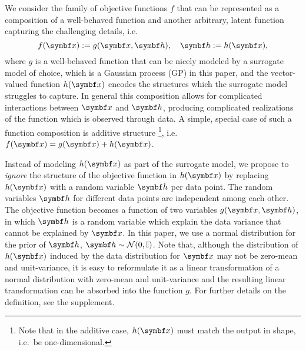 We consider the family of objective functions $f$ that can be represented as a composition of a well-behaved function and another arbitrary, latent function capturing the challenging details, i.e.
\begin{equation}
    \label{eq:bayesian_optimization:well_behaved}
    f(\mat{x}) := g(\mat{x}, \mat{h}), \quad \mat{h}:=h(\mat{x}),
\end{equation}
where $g$ is a well-behaved function that can be nicely modeled by a surrogate model of choice,
which is a Gaussian process (GP) in this paper,
and the vector-valued function $h(\mat{x})$ encodes the structures which the surrogate model struggles to capture.
In general this composition allows for complicated interactions between $\mat{x}$ and $\mat{h}$, producing complicated realizations of the function
which is observed through data.
A simple, special case of such a function composition is additive structure
\footnote{Note that in the additive case, $h(\mat{x})$ must match the output in shape, i.e.~be one-dimensional.},
i.e.\ $f(\mat{x}) = g(\mat{x}) + h(\mat{x})$.

Instead of modeling $h(\mat{x})$ as part of the surrogate model,
we propose to \textit{ignore} the structure of the objective function in $h(\mat{x})$ by replacing $h(\mat{x})$ with a random variable $\mat{h}$ per data point.
The random variables $\mat{h}$ for different data points  are independent among each other.
The objective function becomes a function of two variables $g(\mat{x}, \mat{h})$,
in which $\mat{h}$ is a random variable which explain the data variance that cannot be explained by $\mat{x}$.
In this paper, we use a normal distribution for the prior of $\mat{h}$, $\mat{h} \sim \mathcal{N}(0,  \mathbb{I})$.
Note that, although the distribution of $h(\mat{x})$ induced by the data distribution for $\mat{x}$ may not be zero-mean and unit-variance, it is easy to reformulate it as a linear transformation of a normal distribution with zero-mean and unit-variance and the resulting linear transformation can be absorbed into the function $g$.
For further details on the definition, see the supplement.

